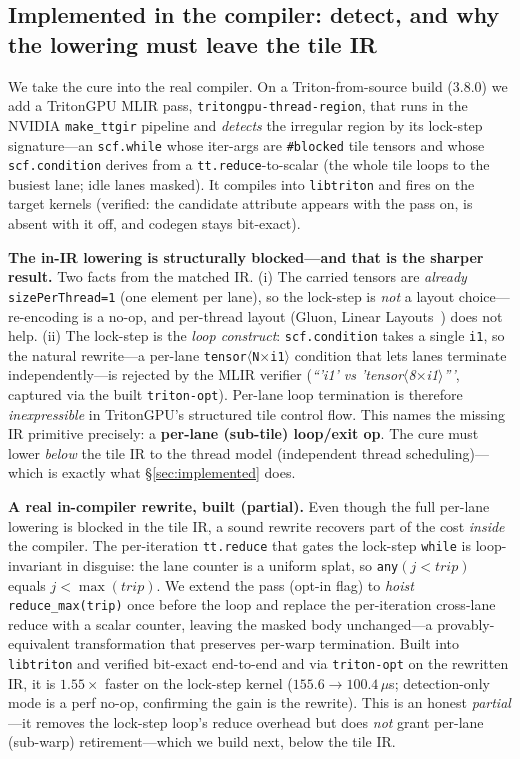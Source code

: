 \documentclass[conference]{IEEEtran}
\begin{document}
\subsection{Implemented in the compiler: detect, and why the lowering must leave the tile IR}
\label{sec:compiler}
We take the cure into the real compiler. On a Triton-from-source build (3.8.0) we add a TritonGPU MLIR
pass, \texttt{tritongpu-thread-region}, that runs in the NVIDIA \texttt{make\_ttgir} pipeline and
\emph{detects} the irregular region by its lock-step signature---an \texttt{scf.while} whose iter-args
are \texttt{\#blocked} tile tensors and whose \texttt{scf.condition} derives from a
\texttt{tt.reduce}-to-scalar (the whole tile loops to the busiest lane; idle lanes masked). It compiles
into \texttt{libtriton} and fires on the target kernels (verified: the candidate attribute appears with
the pass on, is absent with it off, and codegen stays bit-exact).

\textbf{The in-IR lowering is structurally blocked---and that is the sharper result.} Two facts from the
matched IR. (i) The carried tensors are \emph{already} \texttt{sizePerThread=1} (one element per lane),
so the lock-step is \emph{not} a layout choice---re-encoding is a no-op, and per-thread layout (Gluon,
Linear Layouts~\cite{linearlayouts2025}) does not help. (ii) The lock-step is the \emph{loop construct}:
\texttt{scf.condition} takes a single \texttt{i1}, so the natural rewrite---a per-lane
\texttt{tensor$\langle$N$\times$i1$\rangle$} condition that lets lanes terminate independently---is
rejected by the MLIR verifier (\emph{``'i1' vs 'tensor$\langle$8$\times$i1$\rangle$'''}, captured via the
built \texttt{triton-opt}). Per-lane loop termination is therefore \emph{inexpressible} in TritonGPU's
structured tile control flow. This names the missing IR primitive precisely: a \textbf{per-lane
(sub-tile) loop/exit op}. The cure must lower \emph{below} the tile IR to the thread model (independent
thread scheduling)---which is exactly what \S\ref{sec:implemented} does.

\textbf{A real in-compiler rewrite, built (partial).} Even though the full per-lane lowering is
blocked in the tile IR, a sound rewrite recovers part of the cost \emph{inside} the compiler. The
per-iteration \texttt{tt.reduce} that gates the lock-step \texttt{while} is loop-invariant in disguise:
the lane counter is a uniform splat, so \texttt{any}$(j<\mathit{trip})$ equals $j<\max(\mathit{trip})$.
We extend the pass (opt-in flag) to \emph{hoist} \texttt{reduce\_max(trip)} once before the loop and
replace the per-iteration cross-lane reduce with a scalar counter, leaving the masked body unchanged---a
provably-equivalent transformation that preserves per-warp termination. Built into \texttt{libtriton} and
verified bit-exact end-to-end and via \texttt{triton-opt} on the rewritten IR, it is \textbf{$1.55\times$}
faster on the lock-step kernel ($155.6\rightarrow100.4\,\mu$s; detection-only mode is a perf no-op,
confirming the gain is the rewrite). This is an honest \emph{partial}---it removes the lock-step loop's
reduce overhead but does \emph{not} grant per-lane (sub-warp) retirement---which we build next, below the tile IR.
\end{document}
